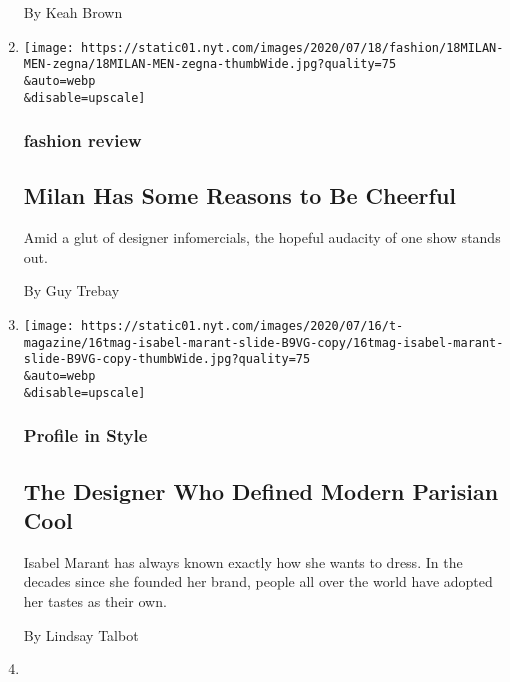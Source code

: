 \begin{enumerate}
  By Keah Brown
\item
  \href{/2020/07/17/style/mens-fashion-milan-provides-reasons-to-be-cheerful.html}{}

  \texttt{[image: https://static01.nyt.com/images/2020/07/18/fashion/18MILAN-MEN-zegna/18MILAN-MEN-zegna-thumbWide.jpg?quality=75\\\&auto=webp\\\&disable=upscale]}

  \hypertarget{fashion-review}{%
  \subsubsection{fashion review}\label{fashion-review}}

  \hypertarget{milan-has-some-reasons-to-be-cheerful}{%
  \subsection{Milan Has Some Reasons to Be
  Cheerful}\label{milan-has-some-reasons-to-be-cheerful}}

  Amid a glut of designer infomercials, the hopeful audacity of one show
  stands out.

  By Guy Trebay
\item
  \href{/2020/07/16/t-magazine/isabel-marant.html}{}

  \texttt{[image: https://static01.nyt.com/images/2020/07/16/t-magazine/16tmag-isabel-marant-slide-B9VG-copy/16tmag-isabel-marant-slide-B9VG-copy-thumbWide.jpg?quality=75\\\&auto=webp\\\&disable=upscale]}

  \hypertarget{profile-in-style}{%
  \subsubsection{Profile in Style}\label{profile-in-style}}

  \hypertarget{the-designer-who-defined-modern-parisian-cool}{%
  \subsection{The Designer Who Defined Modern Parisian
  Cool}\label{the-designer-who-defined-modern-parisian-cool}}

  Isabel Marant has always known exactly how she wants to dress. In the
  decades since she founded her brand, people all over the world have
  adopted her tastes as their own.

  By Lindsay Talbot
\item
  \href{/2020/07/16/t-magazine/margo-price-album-tlist.html}{}


\end{enumerate}
